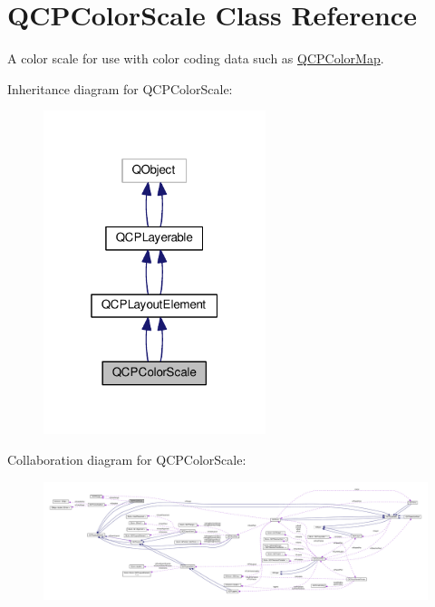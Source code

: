 \hypertarget{class_q_c_p_color_scale}{}\section{Q\+C\+P\+Color\+Scale Class Reference}
\label{class_q_c_p_color_scale}


A color scale for use with color coding data such as \hyperlink{class_q_c_p_color_map}{Q\+C\+P\+Color\+Map}.  




Inheritance diagram for Q\+C\+P\+Color\+Scale\+:\nopagebreak
\begin{figure}[H]
\begin{center}
\leavevmode
\includegraphics[width=184pt]{class_q_c_p_color_scale__inherit__graph}
\end{center}
\end{figure}


Collaboration diagram for Q\+C\+P\+Color\+Scale\+:\nopagebreak
\begin{figure}[H]
\begin{center}
\leavevmode
\includegraphics[width=350pt]{class_q_c_p_color_scale__coll__graph}
\end{center}
\end{figure}
